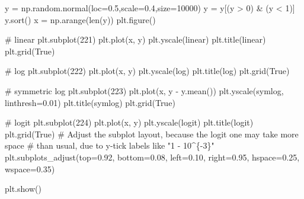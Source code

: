 \documentclass[
  letterpaper,
  DIV=11,
  numbers=noendperiod]{scrreprt}
\newenvironment{Shaded}{\begin{snugshade}}{\end{snugshade}}
\newcommand{\BuiltInTok}[1]{\textcolor[rgb]{0.00,0.23,0.31}{#1}}
\newcommand{\CommentTok}[1]{\textcolor[rgb]{0.37,0.37,0.37}{#1}}
\newcommand{\DecValTok}[1]{\textcolor[rgb]{0.68,0.00,0.00}{#1}}
\newcommand{\FloatTok}[1]{\textcolor[rgb]{0.68,0.00,0.00}{#1}}
\newcommand{\NormalTok}[1]{\textcolor[rgb]{0.00,0.23,0.31}{#1}}
\newcommand{\OperatorTok}[1]{\textcolor[rgb]{0.37,0.37,0.37}{#1}}
\newcommand{\StringTok}[1]{\textcolor[rgb]{0.13,0.47,0.30}{#1}}
\newcommand{\VariableTok}[1]{\textcolor[rgb]{0.07,0.07,0.07}{#1}}
\begin{document}
\begin{Shaded}
\begin{Highlighting}[]
\NormalTok{y }\OperatorTok{=}\NormalTok{ np.random.normal(loc}\OperatorTok{=}\FloatTok{0.5}\NormalTok{,scale}\OperatorTok{=}\FloatTok{0.4}\NormalTok{,size}\OperatorTok{=}\DecValTok{10000}\NormalTok{)}
\NormalTok{y }\OperatorTok{=}\NormalTok{ y[(y }\OperatorTok{\textgreater{}} \DecValTok{0}\NormalTok{) }\OperatorTok{\&}\NormalTok{ (y }\OperatorTok{\textless{}} \DecValTok{1}\NormalTok{)]}
\NormalTok{y.sort()}
\NormalTok{x }\OperatorTok{=}\NormalTok{ np.arange(}\BuiltInTok{len}\NormalTok{(y))}
\NormalTok{plt.figure()}

\CommentTok{\# linear}
\NormalTok{plt.subplot(}\DecValTok{221}\NormalTok{)}
\NormalTok{plt.plot(x, y)}
\NormalTok{plt.yscale(}\StringTok{\textquotesingle{}linear\textquotesingle{}}\NormalTok{)}
\NormalTok{plt.title(}\StringTok{\textquotesingle{}linear\textquotesingle{}}\NormalTok{)}
\NormalTok{plt.grid(}\VariableTok{True}\NormalTok{)}

\CommentTok{\# log}
\NormalTok{plt.subplot(}\DecValTok{222}\NormalTok{)}
\NormalTok{plt.plot(x, y)}
\NormalTok{plt.yscale(}\StringTok{\textquotesingle{}log\textquotesingle{}}\NormalTok{)}
\NormalTok{plt.title(}\StringTok{\textquotesingle{}log\textquotesingle{}}\NormalTok{)}
\NormalTok{plt.grid(}\VariableTok{True}\NormalTok{)}

\CommentTok{\# symmetric log}
\NormalTok{plt.subplot(}\DecValTok{223}\NormalTok{)}
\NormalTok{plt.plot(x, y }\OperatorTok{{-}}\NormalTok{ y.mean())}
\NormalTok{plt.yscale(}\StringTok{\textquotesingle{}symlog\textquotesingle{}}\NormalTok{, linthresh}\OperatorTok{=}\FloatTok{0.01}\NormalTok{)}
\NormalTok{plt.title(}\StringTok{\textquotesingle{}symlog\textquotesingle{}}\NormalTok{)}
\NormalTok{plt.grid(}\VariableTok{True}\NormalTok{)}

\CommentTok{\# logit}
\NormalTok{plt.subplot(}\DecValTok{224}\NormalTok{)}
\NormalTok{plt.plot(x, y)}
\NormalTok{plt.yscale(}\StringTok{\textquotesingle{}logit\textquotesingle{}}\NormalTok{)}
\NormalTok{plt.title(}\StringTok{\textquotesingle{}logit\textquotesingle{}}\NormalTok{)}
\NormalTok{plt.grid(}\VariableTok{True}\NormalTok{)}
\CommentTok{\# Adjust the subplot layout, because the logit one may take more space}
\CommentTok{\# than usual, due to y{-}tick labels like "1 {-} 10\^{}\{{-}3\}"}
\NormalTok{plt.subplots\_adjust(top}\OperatorTok{=}\FloatTok{0.92}\NormalTok{, bottom}\OperatorTok{=}\FloatTok{0.08}\NormalTok{, left}\OperatorTok{=}\FloatTok{0.10}\NormalTok{, right}\OperatorTok{=}\FloatTok{0.95}\NormalTok{, hspace}\OperatorTok{=}\FloatTok{0.25}\NormalTok{,}
\NormalTok{                    wspace}\OperatorTok{=}\FloatTok{0.35}\NormalTok{)}

\NormalTok{plt.show()}
\end{Highlighting}
\end{Shaded}
\end{document}
